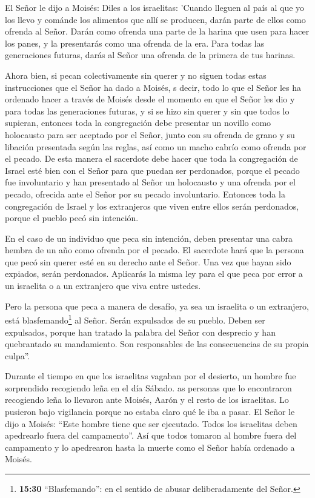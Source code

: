  El Señor le dijo a Moisés:  Diles a los
israelitas: 'Cuando lleguen al país al que yo los llevo  y
cománde los alimentos que allí se producen, darán parte de ellos como
ofrenda al Señor.  Darán como ofrenda una parte de la
harina que usen para hacer los panes, y la presentarás como una ofrenda
de la era.  Para todas las generaciones futuras, darás al
Señor una ofrenda de la primera de tus harinas.

 Ahora bien, si pecan colectivamente sin querer y no siguen
todas estas instrucciones que el Señor ha dado a Moisés,  s
decir, todo lo que el Señor les ha ordenado hacer a través de Moisés
desde el momento en que el Señor les dio y para todas las generaciones
futuras,  y si se hizo sin querer y sin que todos lo
supieran, entonces toda la congregación debe presentar un novillo como
holocausto para ser aceptado por el Señor, junto con su ofrenda de grano
y su libación presentada según las reglas, así como un macho cabrío como
ofrenda por el pecado.  De esta manera el sacerdote debe
hacer que toda la congregación de Israel esté bien con el Señor para que
puedan ser perdonados, porque el pecado fue involuntario y han
presentado al Señor un holocausto y una ofrenda por el pecado, ofrecida
ante el Señor por su pecado involuntario.  Entonces toda la
congregación de Israel y los extranjeros que viven entre ellos serán
perdonados, porque el pueblo pecó sin intención.

 En el caso de un individuo que peca sin intención, deben
presentar una cabra hembra de un año como ofrenda por el pecado.
 El sacerdote hará que la persona que pecó sin querer esté
en su derecho ante el Señor. Una vez que hayan sido expiados, serán
perdonados.  Aplicarás la misma ley para el que peca por
error a un israelita o a un extranjero que viva entre ustedes.

 Pero la persona que peca a manera de desafío, ya sea un
israelita o un extranjero, está blasfemando\footnote{\textbf{15:30}
  ``Blasfemando'': en el sentido de abusar deliberadamente del Señor.}
al Señor. Serán expulsados de su pueblo.  Deben ser
expulsados, porque han tratado la palabra del Señor con desprecio y han
quebrantado su mandamiento. Son responsables de las consecuencias de su
propia culpa''.

 Durante el tiempo en que los israelitas vagaban por el
desierto, un hombre fue sorprendido recogiendo leña en el día Sábado.
 as personas que lo encontraron recogiendo leña lo llevaron
ante Moisés, Aarón y el resto de los israelitas.  Lo
pusieron bajo vigilancia porque no estaba claro qué le iba a pasar.
 El Señor le dijo a Moisés: ``Este hombre tiene que ser
ejecutado. Todos los israelitas deben apedrearlo fuera del campamento''.
 Así que todos tomaron al hombre fuera del campamento y lo
apedrearon hasta la muerte como el Señor había ordenado a Moisés.

